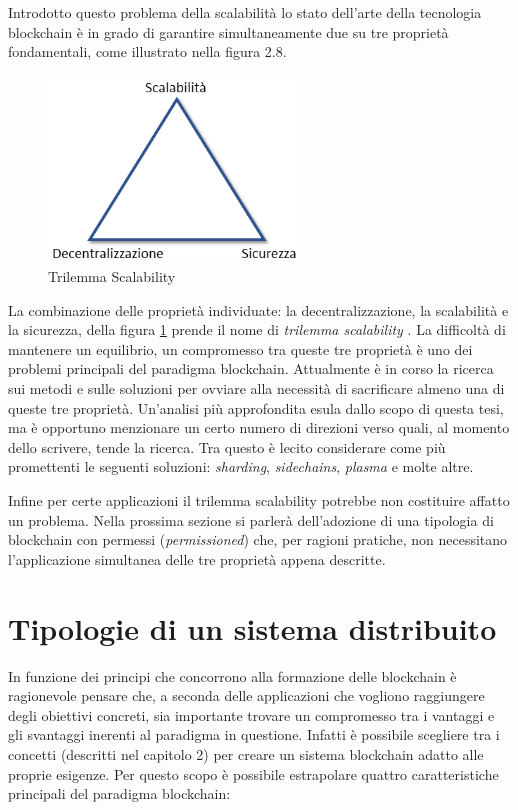 Introdotto questo problema della scalabilità lo stato dell’arte della tecnologia blockchain è in grado di garantire simultaneamente due su tre proprietà fondamentali, come illustrato nella figura 2.8.

\begin{figure}[H]
\centering
\includegraphics[width=0.6\textwidth]{immagini/trilemmascalab.png}
\caption{Trilemma Scalability}
\label{fig:TrilemmaScalab}
\end{figure}

La combinazione delle proprietà individuate: la decentralizzazione, la scalabilità e la sicurezza, della figura \ref{fig:TrilemmaScalab} prende il nome di \emph{trilemma scalability} . La difficoltà di mantenere un equilibrio, un compromesso tra queste tre proprietà è uno dei problemi principali del paradigma blockchain. Attualmente è in corso la ricerca sui metodi e sulle soluzioni per ovviare alla necessità di sacrificare almeno una di queste tre proprietà. Un’analisi più approfondita esula dallo scopo di questa tesi, ma è opportuno menzionare un certo numero di direzioni verso quali, al momento dello scrivere, tende la ricerca. Tra questo è lecito considerare come più promettenti le seguenti soluzioni: \emph{sharding}, \emph{sidechains}, \emph{plasma} e molte altre.

Infine per certe applicazioni il trilemma scalability potrebbe non costituire affatto un problema. Nella prossima sezione si parlerà dell’adozione di una tipologia di blockchain con permessi (\emph{permissioned}) che, per ragioni pratiche, non necessitano l’applicazione simultanea delle tre proprietà appena descritte.

\section{Tipologie di un sistema distribuito} %

In funzione dei principi che concorrono alla formazione delle blockchain è ragionevole pensare che, a seconda delle applicazioni che vogliono raggiungere degli obiettivi concreti, sia importante trovare un compromesso tra i vantaggi e gli svantaggi inerenti al paradigma in questione. Infatti è possibile scegliere tra i concetti (descritti nel capitolo 2) per creare un sistema blockchain adatto alle proprie esigenze. Per questo scopo è possibile estrapolare quattro caratteristiche principali del paradigma blockchain:

